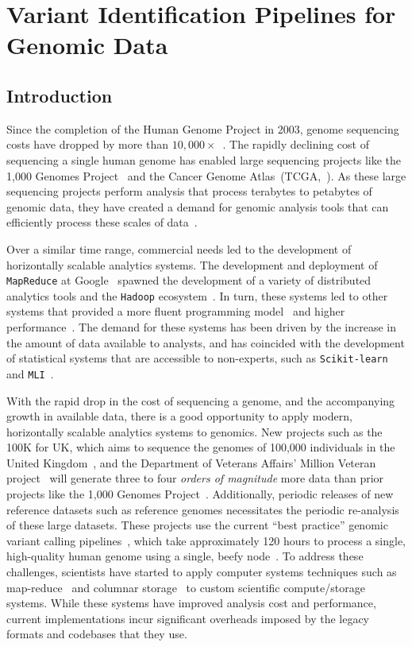 \documentclass[masters]{ucbthesis}
\begin{document}
\tableofcontents

\chapter{Variant Identification Pipelines for Genomic Data}

\section{Introduction}
\label{sec:introduction}

Since the completion of the Human Genome Project in 2003, genome sequencing costs have dropped
by more than $10,000\times$~\cite{nhgri}. The rapidly declining cost of sequencing a single human
genome has enabled large sequencing projects like the 1,000 Genomes Project~\cite{siva08} and
the Cancer Genome Atlas~(TCGA,~\cite{weinstein13}). As these large sequencing projects perform
analysis that process terabytes to petabytes of genomic data, they have created a demand
for genomic analysis tools that can efficiently process these scales of data~\cite{schadt10, stein10}.

Over a similar time range, commercial needs led to the development of horizontally scalable analytics
systems. The development and deployment of \texttt{MapReduce} at Google~\cite{dean04, dean08} spawned
the development of a variety of distributed analytics tools and the \texttt{Hadoop} ecosystem~\cite{hadoop}.
In turn, these systems led to other systems that provided a more fluent programming
model~\cite{yu08} and higher performance~\cite{zaharia10}. The demand for these systems has
been driven by the increase in the amount of data available to analysts, and has coincided with the
development of statistical systems that are accessible to non-experts, such as
\texttt{Scikit-learn}~\cite{pedregosa11} and \texttt{MLI}~\cite{sparks13}.

With the rapid drop in the cost of sequencing a genome, and the accompanying growth in available data,
there is a good opportunity to apply modern, horizontally scalable analytics systems to genomics. New
projects such as the 100K for UK, which aims to sequence the genomes of 100,000 individuals in the
United Kingdom~\cite{uk100k}, and the Department of Veterans Affairs' Million Veteran project~\cite{mvp}
will generate three to four \emph{orders of magnitude} more data than prior projects like the 1,000
Genomes Project~\cite{siva08}. Additionally, periodic releases of new reference datasets such as reference
genomes necessitates the periodic re-analysis of these large datasets. These projects use the current ``best
practice'' genomic variant calling pipelines~\cite{auwera13}, which take approximately 120 hours to
process a single, high-quality human genome using a single, beefy node~\cite{talwalkar14}. To address
these challenges, scientists have started to apply computer systems techniques such as
map-reduce~\cite{langmead09, mckenna10, schatz09} and columnar storage~\cite{fritz11} to custom
scientific compute/storage systems. While these systems have improved analysis cost and performance,
current implementations incur significant overheads imposed by the legacy formats and codebases that
they use.
\end{document}
